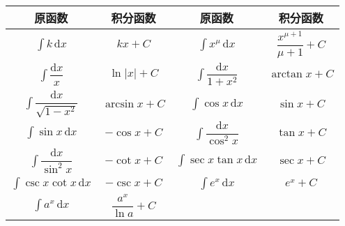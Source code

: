 \documentclass[UTF8, 12pt]{ctexart}
\begin{document}
\begin{center}
    \begin{tabular}{|c|c|c|c|}
        \hline
        原函数 & 积分函数 & 原函数 & 积分函数\\ \hline
        $\int k\,\textrm{d}x$ & $kx+C$ & $\int x^\mu\,\textrm{d}x$ & $\dfrac{x^{\mu+1}}{\mu+1}+C$ \\ \hline
        $\int\dfrac{\textrm{d}x}{x}$ & $\ln\vert x\vert+C$ & $\int\dfrac{\textrm{d}x}{1+x^2}$ & $\arctan x+C$ \\ \hline
        $\int\dfrac{\textrm{d}x}{\sqrt{1-x^2}}$ & $\arcsin x+C$ & $\int\cos x\,\textrm{d}x$ & $\sin x+C$ \\ \hline
        $\int\sin x\,\textrm{d}x$ & $-\cos x+C$ & $\int\dfrac{\textrm{d}x}{\cos^2x}$ & $\tan x+C$ \\ \hline
        $\int\dfrac{\textrm{d}x}{\sin^2x}$ & $-\cot x+C$ & $\int\sec x\tan x\,\textrm{d}x$ & $\sec x+C$ \\ \hline
        $\int\csc x\cot x\,\textrm{d}x$ & $-\csc x+C$ & $\int e^x\,\textrm{d}x$ & $e^x+C$ \\ \hline
        $\int a^x\,\textrm{d}x$ & $\dfrac{a^x}{\ln a}+C$ & & \\
        \hline
    \end{tabular}
\end{center}
\end{document}
